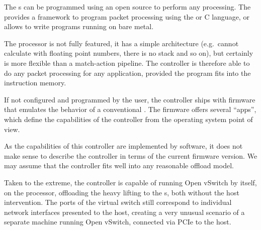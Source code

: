 The s can be programmed using an open source  to perform any
processing. The  provides a framework to program packet processing
using the  or C language, or allows to write programs running on bare
metal.

The processor is not fully featured, it has a simple architecture (e.g.\ cannot
calculate with floating point numbers, there is no stack and so on), but
certainly is more flexible than a match-action pipeline. The controller is
therefore able to do any packet processing for any application, provided the
program fits into the instruction memory.

If not configured and programmed by the user, the controller ships with
firmware that emulates the behavior of a conventional . The firmware
offers several ``apps'', which define the capabilities of the controller from
the operating system point of view.

As the capabilities of this controller are implemented by software, it does not
make sense to describe the controller in terms of the current firmware version. We may
assume that the controller fits well into any reasonable offload model.

Taken to the extreme, the controller is capable of running Open vSwitch by
itself, on the  processor, offloading the heavy lifting to the s,
both without the host intervention. The ports of the virtual switch still
correspond to individual network interfaces presented to the host, creating
a very unusual scenario of a separate machine running Open vSwitch, connected
via PCIe to the host.
